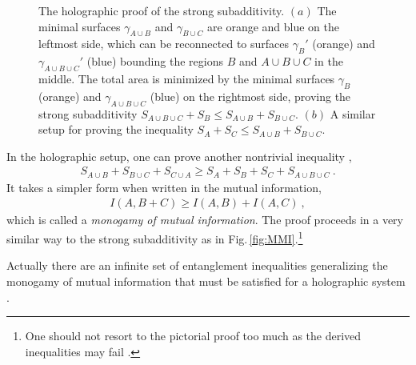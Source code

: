 \begin{figure}[htbp]
	\caption{The holographic proof of the strong subadditivity. 
	$(a)$ The minimal surfaces $\gamma_{A\cup B}$ and $\gamma_{B\cup C}$ are orange and blue on the leftmost side, which can be reconnected to surfaces $\gamma_B'$ (orange) and $\gamma_{A\cup B\cup C}'$ (blue) bounding the regions $B$ and $A\cup B \cup C$ in the middle.
	The total area is minimized by the minimal surfaces $\gamma_B$ (orange) and $\gamma_{A\cup B\cup C}$ (blue) on the rightmost side, proving the strong subadditivity $S_{A\cup B\cup C} + S_{B} \le S_{A\cup B}+S_{B\cup C} $.
	$(b)$ A similar setup for proving the inequality $S_{A} + S_{C} \le S_{A\cup B}+S_{B\cup C}$.
	}
	\label{fig:SSA}
\end{figure}


In the holographic setup, one can prove another nontrivial inequality \cite{Hayden:2011ag},
\begin{align}\label{MMI}
	S_{A\cup B} + S_{B\cup C} + S_{C\cup A} \ge S_A + S_B + S_C + S_{A\cup B\cup C} \ .
\end{align}
It takes a simpler form when written in the mutual information, 
\begin{align}
	I(A, B+C) \ge I(A, B) + I(A,C) \ ,
\end{align}
which is called a \emph{monogamy of mutual information}.
The proof proceeds in a very similar way to the strong subadditivity as in Fig.\,\ref{fig:MMI}.\footnote{One should not resort to the pictorial proof too much as the derived inequalities may fail \cite{Hayden:2011ag}.}

Actually there are an infinite set of entanglement inequalities generalizing the monogamy of mutual information that must be satisfied for a holographic system \cite{Bao:2015bfa}.



